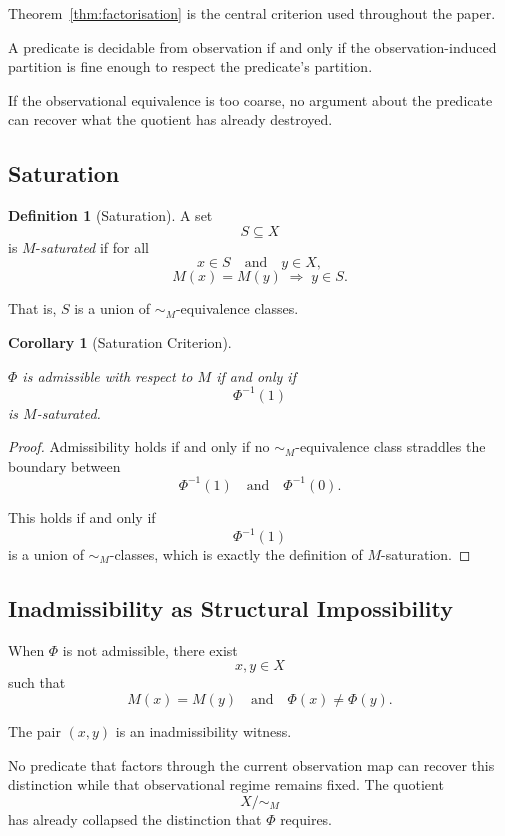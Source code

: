 \documentclass[pdflatex,sn-mathphys-num]{sn-jnl}
\theoremstyle{plain}
\newtheorem{corollary}[theorem]{Corollary}
\theoremstyle{definition}
\newtheorem{definition}[theorem]{Definition}
\theoremstyle{remark}
\begin{document}
Theorem~\ref{thm:factorisation} is the central criterion used throughout the paper.

A predicate is decidable from observation if and only if the
observation-induced partition is fine enough to respect the
predicate's partition.

If the observational equivalence is too coarse, no argument about the
predicate can recover what the quotient has already destroyed.

\subsection{Saturation}

\begin{definition}[Saturation]

A set
\[
S \subseteq X
\]
is $M$-\emph{saturated} if for all
\[
x \in S
\quad\text{and}\quad
y \in X,
\]
\[
M(x) = M(y)
\;\Rightarrow\;
y \in S.
\]

That is, $S$ is a union of $\sim_M$-equivalence classes.
\end{definition}

\begin{corollary}[Saturation Criterion]
\label{cor:saturation}

$\Phi$ is admissible with respect to $M$ if and only if
\[
\Phi^{-1}(1)
\]
is $M$-saturated.
\end{corollary}

\begin{proof}

Admissibility holds if and only if no $\sim_M$-equivalence class
straddles the boundary between
\[
\Phi^{-1}(1)
\quad\text{and}\quad
\Phi^{-1}(0).
\]

This holds if and only if
\[
\Phi^{-1}(1)
\]
is a union of $\sim_M$-classes, which is exactly the definition of
$M$-saturation.
\end{proof}

\subsection{Inadmissibility as Structural Impossibility}

When $\Phi$ is not admissible, there exist
\[
x, y \in X
\]
such that
\[
M(x) = M(y)
\quad\text{and}\quad
\Phi(x) \neq \Phi(y).
\]

The pair $(x,y)$ is an inadmissibility witness.

No predicate that factors through the current observation map can
recover this distinction while that observational regime remains fixed.
The quotient
\[
X/{\sim_M}
\]
has already collapsed the distinction that $\Phi$ requires.
\end{document}

